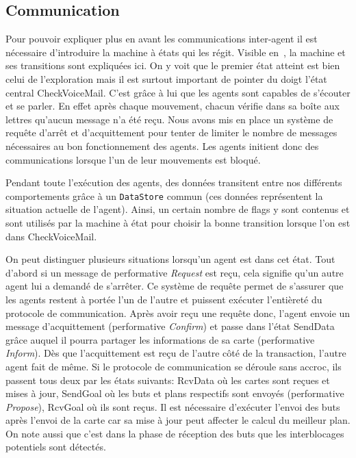\documentclass[11pt]{article}
\begin{document}
\subsection{Communication}
\label{sec-comm}

Pour pouvoir expliquer plus en avant les communications inter-agent il est nécessaire d'introduire la machine à états qui les régit. Visible en~, la machine et ses transitions sont expliquées ici. On y voit que le premier état atteint est bien celui de l'exploration mais il est surtout important de pointer du doigt l'état central \textsf{CheckVoiceMail}. C'est grâce à lui que les agents sont capables de s'écouter et se parler. En effet après chaque mouvement, chacun vérifie dans sa boîte aux lettres qu'aucun message n'a été reçu. Nous avons mis en place un système de requête d'arrêt et d'acquittement pour tenter de limiter le nombre de messages nécessaires au bon fonctionnement des agents. Les agents initient donc des communications lorsque l'un de leur mouvements est bloqué.

Pendant toute l'exécution des agents, des données transitent entre nos différents comportements grâce à un \texttt{DataStore} commun (ces données représentent la situation actuelle de l'agent). Ainsi, un certain nombre de flags y sont contenus et sont utilisés par la machine à état pour choisir la bonne transition lorsque l'on est dans \textsf{CheckVoiceMail}. 

On peut distinguer plusieurs situations lorsqu'un agent est dans cet état. Tout d'abord si un message de performative \textit{Request} est reçu, cela signifie qu'un autre agent lui a demandé de s'arrêter. Ce système de requête permet de s'assurer que les agents restent à portée l'un de l'autre et puissent exécuter l'entièreté du protocole de communication. Après avoir reçu une requête donc, l'agent envoie un message d'acquittement (performative \textit{Confirm}) et passe dans l'état \textsf{SendData} grâce auquel il pourra partager les informations de sa carte (performative \textit{Inform}). Dès que l'acquittement est reçu de l'autre côté de la transaction, l'autre agent fait de même. Si le protocole de communication se déroule sans accroc, ils passent tous deux par les états suivants: \textsf{RcvData} où les cartes sont reçues et mises à jour, \textsf{SendGoal} où les buts et plans respectifs sont envoyés (performative \textit{Propose}), \textsf{RcvGoal} où ils sont reçus. Il est nécessaire d'exécuter l'envoi des buts après l'envoi de la carte car sa mise à jour peut affecter le calcul du meilleur plan. On note aussi que c'est dans la phase de réception des buts que les interblocages potentiels sont détectés.
\end{document}

